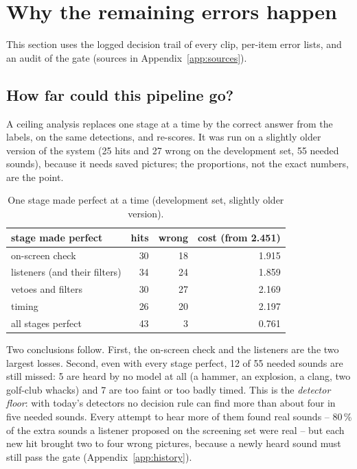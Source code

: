 \section{Why the remaining errors happen}\label{sec:analysis}

This section uses the logged decision trail of every clip, per-item error lists, and an audit of the gate (sources in
Appendix~\ref{app:sources}).

\subsection{How far could this pipeline go?}\label{sec:ceiling}
A ceiling analysis replaces one stage at a time by the correct answer from the labels, on the same detections, and
re-scores. It was run on a slightly older version of the system (25 hits and 27 wrong on the development set, 55 needed
sounds), because it needs saved pictures; the proportions, not the exact numbers, are the point.

\begin{table}[h]
\centering\small
\caption{One stage made perfect at a time (development set, slightly older version).}
\label{tab:ceiling}
\begin{tabular}{lrrr}
\toprule
stage made perfect & hits & wrong & cost (from 2.451) \\
\midrule
on-screen check & 30 & 18 & 1.915 \\
listeners (and their filters) & 34 & 24 & 1.859 \\
vetoes and filters & 30 & 27 & 2.169 \\
timing & 26 & 20 & 2.197 \\
\midrule
all stages perfect & 43 & 3 & 0.761 \\
\bottomrule
\end{tabular}
\end{table}

Two conclusions follow. First, the on-screen check and the listeners are the two largest losses. Second, even with every
stage perfect, 12 of 55 needed sounds are still missed: 5 are heard by no model at all (a hammer, an explosion, a clang,
two golf-club whacks) and 7 are too faint or too badly timed. This is the \emph{detector floor}: with today's detectors
no decision rule can find more than about four in five needed sounds. Every attempt to hear more of them found real
sounds -- 80\,\% of the extra sounds a listener proposed on the screening set were real -- but each new hit brought two to
four wrong pictures, because a newly heard sound must still pass the gate (Appendix~\ref{app:history}).

